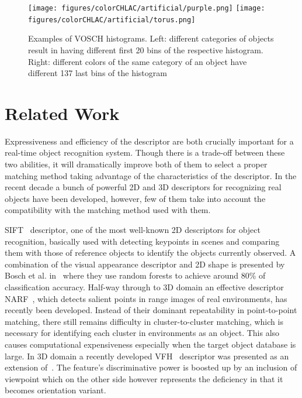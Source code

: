 \documentclass[conference]{sty/IEEEtran}
\begin{document}
\begin{figure}[htb!]
  \begin{center}
    \texttt{[image: figures/colorCHLAC/artificial/purple.png]}
    \texttt{[image: figures/colorCHLAC/artificial/torus.png]}
    \caption{Examples of  VOSCH histograms.
Left: different categories of objects result in having different first 20 bins of the respective histogram.
Right: different colors of the same category of an object have different 137 last bins of the histogram}
    \label{fig:grsd_cchlac}
  \end{center}
\end{figure}


\section{Related Work}
\label{sec:rl}
Expressiveness and efficiency of the descriptor are both crucially important for
a real-time object recognition system.  Though there is a trade-off between
these two abilities, it will dramatically improve both of them to select a
proper matching method taking advantage of the characteristics of the
descriptor. In the recent decade a bunch of powerful 2D and 3D descriptors for
recognizing real objects have been developed, however, few of them take into
account the compatibility with the matching method used with them.

SIFT~\cite{lowe04distinctive} descriptor, one of the most well-known 2D
descriptors for object recognition, basically used with detecting keypoints in
scenes and comparing them with those of reference objects to identify the
objects currently observed. A combination of the visual appearance
descriptor and 2D shape is presented by Bosch et al. in~\cite{Bosch07shape}
where they use random forests to achieve around 80\% of classification 
accuracy. Half-way through to 3D domain an effective descriptor
NARF~\cite{steder10irosws}, which detects salient points in range images of
real environments, has recently been developed.  Instead of their dominant
repeatability in point-to-point matching, there still remains difficulty in
cluster-to-cluster matching, which is necessary for identifying each cluster in
environments as an object. This also causes computational expensiveness
especially when the target object database is large. In 3D domain a recently 
developed VFH~\cite{vfh} descriptor was presented as an extension 
of~\cite{Rusu09ICRA}. The feature's discriminative power is boosted up
by an inclusion of viewpoint which on the other side however represents
the deficiency in that it becomes orientation variant. 
\end{document}
